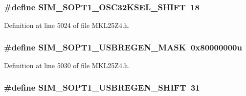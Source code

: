 \subsubsection[{\texorpdfstring{S\+I\+M\+\_\+\+S\+O\+P\+T1\+\_\+\+O\+S\+C32\+K\+S\+E\+L\+\_\+\+S\+H\+I\+FT}{SIM_SOPT1_OSC32KSEL_SHIFT}}]{\setlength{\rightskip}{0pt plus 5cm}\#define S\+I\+M\+\_\+\+S\+O\+P\+T1\+\_\+\+O\+S\+C32\+K\+S\+E\+L\+\_\+\+S\+H\+I\+FT~18}\hypertarget{group___s_i_m___register___masks_gac9e930c4ee375a2aee6fa6c97e061226}{}\label{group___s_i_m___register___masks_gac9e930c4ee375a2aee6fa6c97e061226}


Definition at line 5024 of file M\+K\+L25\+Z4.\+h.

\subsubsection[{\texorpdfstring{S\+I\+M\+\_\+\+S\+O\+P\+T1\+\_\+\+U\+S\+B\+R\+E\+G\+E\+N\+\_\+\+M\+A\+SK}{SIM_SOPT1_USBREGEN_MASK}}]{\setlength{\rightskip}{0pt plus 5cm}\#define S\+I\+M\+\_\+\+S\+O\+P\+T1\+\_\+\+U\+S\+B\+R\+E\+G\+E\+N\+\_\+\+M\+A\+SK~0x80000000u}\hypertarget{group___s_i_m___register___masks_gac60c367119b3dcc752c4cf857b8a59b5}{}\label{group___s_i_m___register___masks_gac60c367119b3dcc752c4cf857b8a59b5}


Definition at line 5030 of file M\+K\+L25\+Z4.\+h.

\subsubsection[{\texorpdfstring{S\+I\+M\+\_\+\+S\+O\+P\+T1\+\_\+\+U\+S\+B\+R\+E\+G\+E\+N\+\_\+\+S\+H\+I\+FT}{SIM_SOPT1_USBREGEN_SHIFT}}]{\setlength{\rightskip}{0pt plus 5cm}\#define S\+I\+M\+\_\+\+S\+O\+P\+T1\+\_\+\+U\+S\+B\+R\+E\+G\+E\+N\+\_\+\+S\+H\+I\+FT~31}\hypertarget{group___s_i_m___register___masks_ga99e46c34c02e39338c9b80775bad09db}{}\label{group___s_i_m___register___masks_ga99e46c34c02e39338c9b80775bad09db}



